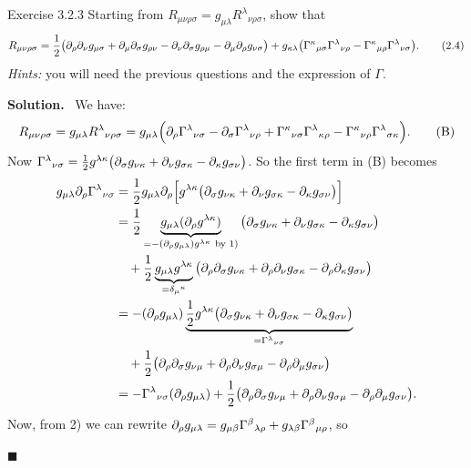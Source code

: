 \documentclass[11pt,a4paper]{article}
\numberwithin{equation}{subsection}
\newenvironment{solution}{\par\noindent\textbf{\textcolor{excol!70!black}{Solution.}}\ }{\hfill$\blacksquare$\par\medskip}
\begin{document}
\begin{problem}{Exercise 3.2.3}
Starting from $R_{\mu\nu\rho\sigma}=g_{\mu\lambda}R^\lambda{}_{\nu\rho\sigma}$, show that
\[
  R_{\mu\nu\rho\sigma}=\frac12\big(\partial_\rho\partial_\nu g_{\mu\sigma}+\partial_\mu\partial_\sigma g_{\rho\nu}-\partial_\nu\partial_\sigma g_{\rho\mu}-\partial_\mu\partial_\rho g_{\nu\sigma}\big)+g_{\kappa\lambda}\big(\Gamma^\kappa{}_{\mu\sigma}\Gamma^\lambda{}_{\nu\rho}-\Gamma^\kappa{}_{\mu\rho}\Gamma^\lambda{}_{\nu\sigma}\big). \tag{2.4}
\]
\emph{Hints:} you will need the previous questions and the expression of $\Gamma$.
\end{problem}
\begin{solution}
We have:
\[
  R_{\mu\nu\rho\sigma}=g_{\mu\lambda}R^\lambda{}_{\nu\rho\sigma}=g_{\mu\lambda}\Big(\partial_\rho\Gamma^\lambda{}_{\nu\sigma}-\partial_\sigma\Gamma^\lambda{}_{\nu\rho}+\Gamma^\kappa{}_{\nu\sigma}\Gamma^\lambda{}_{\kappa\rho}-\Gamma^\kappa{}_{\nu\rho}\Gamma^\lambda{}_{\sigma\kappa}\Big). \tag{B}
\]
Now $\Gamma^\lambda{}_{\nu\sigma}=\frac12g^{\lambda\kappa}\big(\partial_\sigma g_{\nu\kappa}+\partial_\nu g_{\sigma\kappa}-\partial_\kappa g_{\sigma\nu}\big)$. So the first term in (B) becomes
\begin{align*}
  g_{\mu\lambda}\pd_\rho\Gamma^\lambda{}_{\nu\sigma}&=\frac12g_{\mu\lambda}\pd_\rho\Big[g^{\lambda\kappa}\big(\pd_\sigma g_{\nu\kappa}+\pd_\nu g_{\sigma\kappa}-\pd_\kappa g_{\sigma\nu}\big)\Big]\\
  &=\frac12\underbrace{g_{\mu\lambda}(\pd_\rho g^{\lambda\kappa})}_{=-(\pd_\rho g_{\mu\lambda})g^{\lambda\kappa}\ \text{by 1)}}\big(\pd_\sigma g_{\nu\kappa}+\pd_\nu g_{\sigma\kappa}-\pd_\kappa g_{\sigma\nu}\big)\\ &\quad
  +\frac12\underbrace{g_{\mu\lambda}g^{\lambda\kappa}}_{=\delta_\mu{}^\kappa}\big(\pd_\rho\pd_\sigma g_{\nu\kappa}+\pd_\rho\pd_\nu g_{\sigma\kappa}-\pd_\rho\pd_\kappa g_{\sigma\nu}\big)\\
  &=-(\pd_\rho g_{\mu\lambda})\underbrace{\frac12g^{\lambda\kappa}\big(\pd_\sigma g_{\nu\kappa}+\pd_\nu g_{\sigma\kappa}-\pd_\kappa g_{\sigma\nu}\big)}_{=\Gamma^\lambda{}_{\nu\sigma}}\\ &\quad
  +\frac12\big(\pd_\rho\pd_\sigma g_{\nu\mu}+\pd_\rho\pd_\nu g_{\sigma\mu}-\pd_\rho\pd_\mu g_{\sigma\nu}\big)\\
  &=-\Gamma^\lambda{}_{\nu\sigma}(\pd_\rho g_{\mu\lambda})+\frac12\big(\pd_\rho\pd_\sigma g_{\nu\mu}+\pd_\rho\pd_\nu g_{\sigma\mu}-\pd_\rho\pd_\mu g_{\sigma\nu}\big).
\end{align*}
Now, from 2) we can rewrite $\partial_\rho g_{\mu\lambda}=g_{\mu\beta}\Gamma^\beta{}_{\lambda\rho}+g_{\lambda\beta}\Gamma^\beta{}_{\mu\rho}$, so

\end{solution}
\end{document}
